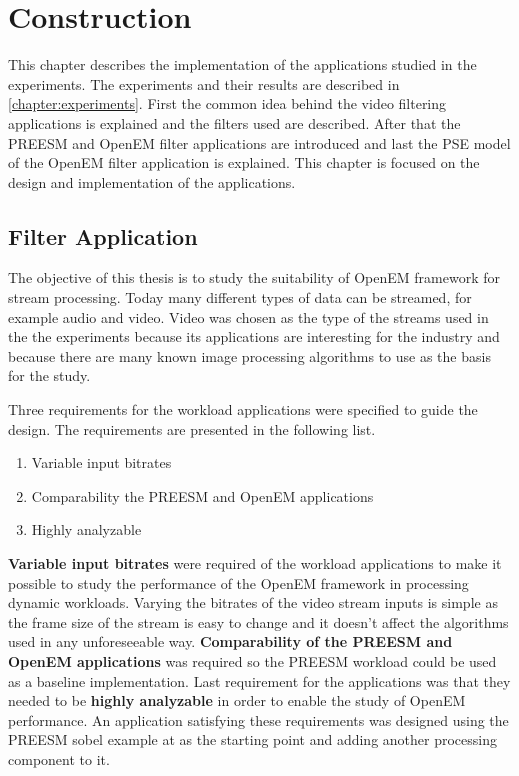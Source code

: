 \chapter{Construction}
\label{chapter:construction}
This chapter describes the implementation of the applications studied in the
experiments. The experiments and their results are described in
\ref{chapter:experiments}. First the common idea behind the video filtering
applications is explained and the filters used are described. After that the
PREESM and OpenEM filter applications are introduced and last the PSE model of
the OpenEM filter application is explained. This chapter is focused on the
design and implementation of the applications.

\section{Filter Application}
\label{sec:filterapp}
The objective of this thesis is to study the suitability of OpenEM framework for
stream processing. Today many different types of data can be streamed, for
example audio and video. Video was chosen as the type of the streams used in the
the experiments because its applications are interesting for the industry and
because there are many known image processing algorithms to use as the basis for
the study.

Three requirements for the workload applications were specified to guide the
design. The requirements are presented in the following list.

\begin{enumerate}
    \item{Variable input bitrates}
    \item{Comparability the PREESM and OpenEM applications}
    \item{Highly analyzable}
\end{enumerate}

\textbf{Variable input bitrates} were required of the workload applications to
make it possible to study the performance of the OpenEM framework in processing
dynamic workloads. Varying the bitrates of the video stream inputs is simple as
the frame size of the stream is easy to change and it doesn't affect the
algorithms used in any unforeseeable way. \textbf{Comparability of the PREESM
and OpenEM applications} was required so the PREESM workload could be used as a
baseline implementation. Last requirement for the applications was that they
needed to be \textbf{highly analyzable} in order to enable the study of OpenEM
performance. An application satisfying these requirements was designed using the
PREESM sobel example at \cite{preesmtut} as the starting point and adding
another processing component to it.

